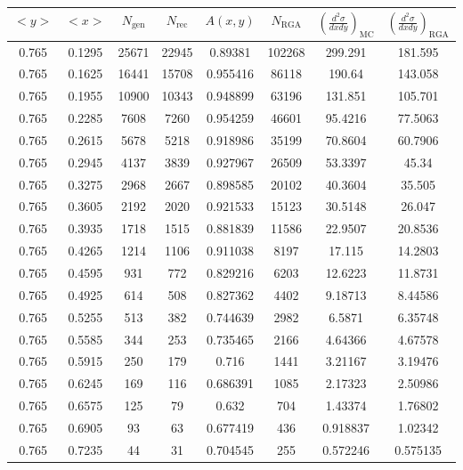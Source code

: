 \begin{table}[h!]
	\centering
	\begin{tabular}{ |c|c|c|c|c|c|c|c| } 
		\hline
		$<y>$ & $<x>$ & $N_{\mathrm{gen}}$ & $N_{\mathrm{rec}}$ & $A(x,y)$ & $N_{\mathrm{RGA}}$ & $\left( \frac{d^2\sigma}{dxdy} \right)_{\mathrm{MC}}$ & $\left( \frac{d^2\sigma}{dxdy} \right)_{\mathrm{RGA}}$ \\
		\hline
		0.765 & 0.1295 & 25671 & 22945 & 0.89381 & 102268 & 299.291 & 181.595 \\ 
		0.765 & 0.1625 & 16441 & 15708 & 0.955416 & 86118 & 190.64 & 143.058 \\ 
		0.765 & 0.1955 & 10900 & 10343 & 0.948899 & 63196 & 131.851 & 105.701 \\ 
		0.765 & 0.2285 & 7608 & 7260 & 0.954259 & 46601 & 95.4216 & 77.5063 \\ 
		0.765 & 0.2615 & 5678 & 5218 & 0.918986 & 35199 & 70.8604 & 60.7906 \\ 
		0.765 & 0.2945 & 4137 & 3839 & 0.927967 & 26509 & 53.3397 & 45.34 \\ 
		0.765 & 0.3275 & 2968 & 2667 & 0.898585 & 20102 & 40.3604 & 35.505 \\ 
		0.765 & 0.3605 & 2192 & 2020 & 0.921533 & 15123 & 30.5148 & 26.047 \\ 
		0.765 & 0.3935 & 1718 & 1515 & 0.881839 & 11586 & 22.9507 & 20.8536 \\ 
		0.765 & 0.4265 & 1214 & 1106 & 0.911038 & 8197 & 17.115 & 14.2803 \\ 
		0.765 & 0.4595 & 931 & 772 & 0.829216 & 6203 & 12.6223 & 11.8731 \\
		0.765 & 0.4925 & 614 & 508 & 0.827362 & 4402 & 9.18713 & 8.44586 \\ 
		0.765 & 0.5255 & 513 & 382 & 0.744639 & 2982 & 6.5871 & 6.35748 \\ 
		0.765 & 0.5585 & 344 & 253 & 0.735465 & 2166 & 4.64366 & 4.67578 \\ 
		0.765 & 0.5915 & 250 & 179 & 0.716 & 1441 & 3.21167 & 3.19476 \\ 
		0.765 & 0.6245 & 169 & 116 & 0.686391 & 1085 & 2.17323 & 2.50986 \\ 
		0.765 & 0.6575 & 125 & 79 & 0.632 & 704 & 1.43374 & 1.76802 \\ 
		0.765 & 0.6905 & 93 & 63 & 0.677419 & 436 & 0.918837 & 1.02342 \\ 
		0.765 & 0.7235 & 44 & 31 & 0.704545 & 255 & 0.572246 & 0.575135 \\ 
		\hline
	\end{tabular}
\end{table}